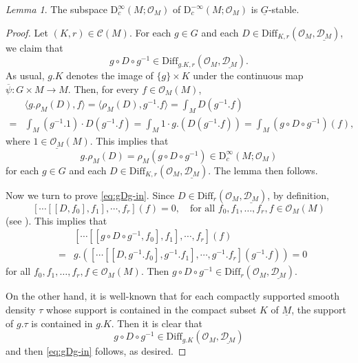 \documentclass[12pt, a4paper]{amsart}
\newcommand{\CO}{{\mathcal {O}}}
\newcommand{\RD}{{\mathrm {D}}}
\newcommand{\la}{\langle}
\newcommand{\ra}{\rangle}
\newcommand{\be}{\begin {equation}}
\newcommand{\ee}{\end {equation}}
\theoremstyle{Theorem}
\theoremstyle{Theorem}
\theoremstyle{Theorem}
\theoremstyle{Theorem}
\theoremstyle{Plain}
\theoremstyle{remark}
\theoremstyle{remark}
\theoremstyle{Definition}
\newtheorem{lemd}[dfn]{Lemma}
\numberwithin{equation}{section}
\begin{document}
 
\begin{lemd}\label{lem:GOMsm1}
	    The subspace $\RD^{\infty}_c(M;\CO_M)$ of $\RD^{-\infty}_c(M;\CO_M)$ is $\underline{ G}$-stable. 
\end{lemd}
\begin{proof}
Let $(K,r)\in \mathcal{C}(M)$. 
For each $g\in G$ and each $D
\in\mathrm{Diff}_{K,r}(\CO_M,\underline{\mathcal{D}_M})$,  we claim that 
\be\label{eq:gDg-in} g\circ D\circ g^{-1}\in \mathrm{Diff}_{g.K,r}(\CO_M,\underline{\mathcal{D}_M}).\ee As usual, $g.K$ denotes the image of $\{g\}\times K$ under the continuous map $\overline{\psi}: G\times M\rightarrow M$. 
Then, for every $f\in \CO_M(M)$, 
\[
\begin{aligned}
&\la g.\rho_M(D),f\ra
=\la\rho_M(D),g^{-1}.f \ra
 = \int_M D(g^{-1}.f)  \\
=&\int_M (g^{-1}.1)\cdot D(g^{-1}.f)=\int_M 1 \cdot g.(D(g^{-1}.f))
 =\int_M (g\circ D\circ g^{-1})(f),
\end{aligned}
\] where $1\in \underline{\CO_M}(M)$.
This implies that \be \label{eq:gonD}g.\rho_M(D)=\rho_M(g\circ D\circ g^{-1})\in \RD^{\infty}_c(M;\CO_M)\ee for each $g\in G$ and each $D
\in\mathrm{Diff}_{K,r}(\CO_M,\underline{\mathcal{D}_M})$. 
The lemma then follows. 

Now we turn to prove \eqref{eq:gDg-in}.
Since $D\in \mathrm{Diff}_r(\CO_M,\underline{\mathcal{D}_M})$, by definition,
\[ [\cdots[[D,f_0],f_1],\cdots, f_{r}](f)=0, \quad\text{for all $f_0,f_1,\dots,f_r,f\in \CO_M(M)$}\]
(see \cite[Proposition 3.8 and Definition 3.1]{CSW1}).
This implies that 
\begin{eqnarray*}
   && [\cdots[[g\circ D\circ g^{-1},f_0],f_1],\cdots, f_{r}](f) \\ &=& g.([\cdots[[D,g^{-1}.f_0],g^{-1}.f_1],\cdots, g^{-1}.f_{r}](g^{-1}.f))=0
\end{eqnarray*}
for all $f_0,f_1,\dots, f_r,f\in \CO_M(M)$. Then 
$g\circ D\circ g^{-1}\in \mathrm{Diff}_r(\CO_M,\underline{\mathcal{D}_M})$. 

On the other hand, it is well-known that for each compactly supported smooth density $\tau$ whose support is contained in the compact subset $K$ of $\underline M$, the support of $g.\tau$ is contained in $g.K$. Then 
it is clear that \be\label{eq:supp}g\circ D\circ g^{-1}\in \mathrm{Diff}_{g.K}(\CO_M,\underline{\mathcal{D}_M})\ee and then \eqref{eq:gDg-in} follows, as desired.
\end{proof}
\end{document}
